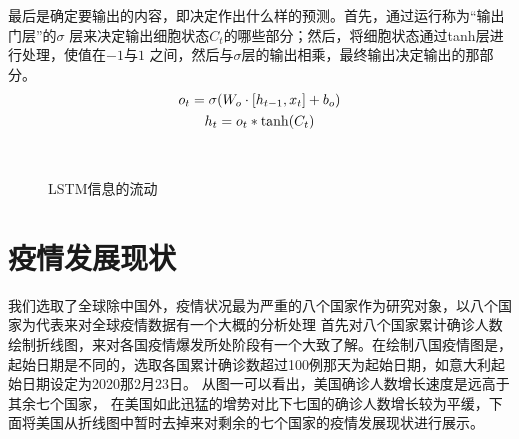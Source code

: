 \documentclass[lang=cn,11pt,a4paper,cite=authoryear]{elegantpaper}
\begin{document}
最后是确定要输出的内容，即决定作出什么样的预测。首先，通过运行称为“输出门层”的$\sigma$
层来决定输出细胞状态$C_t$的哪些部分；然后，将细胞状态通过tanh层进行处理，使值在$-1$与$1$
之间，然后与$\sigma$层的输出相乘，最终输出决定输出的那部分。
\begin{gather}
o_t=\sigma(W_o \cdot [h_{t-1},x_t]+b_o) \\
h_t=o_t*{\rm tanh}(C_t)
\end{gather}

\begin{figure}[htp]
	\centering
	\\
    \caption{LSTM信息的流动}
	\label{fig:LSTM}
\end{figure}

\section{疫情发展现状}

我们选取了全球除中国外，疫情状况最为严重的八个国家作为研究对象，以八个国家为代表来对全球疫情数据有一个大概的分析处理
首先对八个国家累计确诊人数绘制折线图，来对各国疫情爆发所处阶段有一个大致了解。在绘制八国疫情图是，起始日期是不同的，选取各国累计确诊数超过100例那天为起始日期，如意大利起始日期设定为2020那2月23日。   
从图一可以看出，美国确诊人数增长速度是远高于其余七个国家， 在美国如此迅猛的增势对比下七国的确诊人数增长较为平缓，下面将美国从折线图中暂时去掉来对剩余的七个国家的疫情发展现状进行展示。
\end{document}
